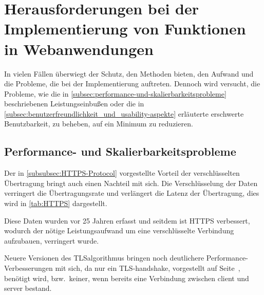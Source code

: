 \newpage
\section[Herausforderungen bei der Implementierung von kryptografischen Funktionen in Webanwendungen]{Herausforderungen bei der Implementierung von  Funktionen in Webanwendungen}\label{sec:Herausforderung-bei-der-implementierung-von-kryptografie-in-webanwendungen}
In vielen Fällen überwiegt der Schutz, den  Methoden bieten, den Aufwand und die Probleme, die bei der Implementierung auftreten.
Dennoch wird versucht, die Probleme, wie \zb die in \autoref{subsec:performance-und-skalierbarkeitsprobleme} beschriebenen Leistungseinbußen oder die in \autoref{subsec:benutzerfreundlichkeit_und_usability-aspekte} erläuterte erschwerte Benutzbarkeit, zu beheben, \bzw auf ein Minimum zu reduzieren.

\subsection[Performance- und Skalierbarkeitsprobleme]{Performance- und Skalierbarkeitsprobleme}\label{subsec:performance-und-skalierbarkeitsprobleme}
Der in \autoref{subsubsec:HTTPS-Protocol} vorgestellte Vorteil der verschlüsselten Übertragung bringt auch einen Nachteil mit sich.
Die Verschlüsselung der Daten verringert die Übertragungsrate und verlängert die Latenz der Übertragung\autocite[]{goldberg-comparison-nodate}, dies wird in \autoref{tab:HTTPS} dargestellt.

Diese Daten wurden vor 25 Jahren erfasst und seitdem ist \ac{HTTPS} verbessert, wodurch der nötige Leistungsaufwand um eine verschlüsselte Verbindung aufzubauen, verringert wurde.\autocite[\vglf][]{CloudfareWarumHTTPS:online}

Neuere Versionen des \ac{TLS}\nonbreakdash \gls{algorithmus} bringen noch deutlichere Performance-Verbesserungen mit sich, da \uam nur ein \ac{TLS}-\gls{handshake}, vorgestellt auf Seite\ \pageref{par:tls_handshake_protocol}, benötigt wird, bzw.\ keiner, wenn bereits eine Verbindung zwischen \gls{client} und \gls{server} bestand\autocite[\vglf][]{CloudfareWarumHTTPS:online}.

